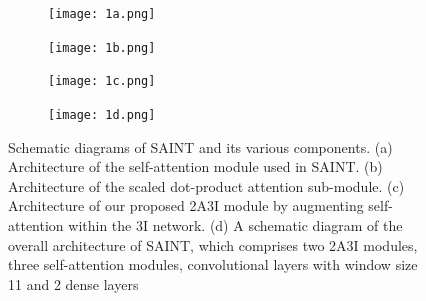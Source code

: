 \documentclass{article}
\begin{document}
\begin{figure}[H]
     \centering
     \begin{subfigure}[b]{0.4\textwidth}
         \centering
         \texttt{[image: 1a.png]}
         \caption{}
         \label{fig:y equals x}
     \end{subfigure}
     \begin{subfigure}[b]{0.4\textwidth}
         \centering
         \texttt{[image: 1b.png]}
         \caption{}
         \label{fig:three sin x}
     \end{subfigure}
     \begin{subfigure}[b]{0.4\textwidth}
         \centering
         \texttt{[image: 1c.png]}
         \caption{}
         \label{fig:five over x}
     \end{subfigure}
     \begin{subfigure}[b]{0.4\textwidth}
         \centering
         \texttt{[image: 1d.png]}
         \caption{}
         \label{fig:five over x}
     \end{subfigure}

        \caption{Schematic diagrams of SAINT and its various components. (a) Architecture of the self-attention module used in SAINT. (b) Architecture of the scaled dot-product attention sub-module. (c) Architecture of our proposed 2A3I module by augmenting self-attention within the 3I network. (d) A schematic diagram of the overall architecture of
SAINT, which comprises two 2A3I modules, three self-attention modules, convolutional layers with window size 11 and 2 dense layers}
        \label{fig:three graphs}

\end{figure}
\end{document}
